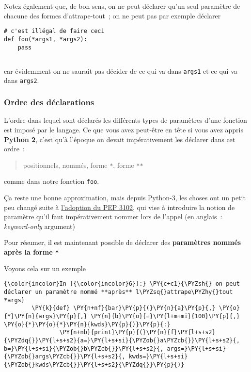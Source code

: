     Notez également que, de bon sens, on ne peut déclarer qu'un seul
paramètre de chacune des formes d'attrape-tout~; on ne peut pas par
exemple déclarer

\begin{verbatim}
# c'est illégal de faire ceci
def foo(*args1, *args2):
    pass
  
\end{verbatim}

car évidemment on ne saurait pas décider de ce qui va dans
\texttt{args1} et ce qui va dans \texttt{args2}.

    \hypertarget{ordre-des-duxe9clarations}{%
\subsubsection{Ordre des déclarations}\label{ordre-des-duxe9clarations}}

    L'ordre dans lequel sont déclarés les différents types de paramètres
d'une fonction est imposé par le langage. Ce que vous avez peut-être en
tête si vous avez appris \textbf{Python 2}, c'est qu'à l'époque on
devait impérativement les déclarer dans cet ordre~:

\begin{quote}
positionnels, nommés, forme \texttt{*}, forme \texttt{**}
\end{quote}

comme dans notre fonction \texttt{foo}.

    Ça reste une bonne approximation, mais depuis Python-3, les choses ont
un petit peu changé suite à
\href{https://www.python.org/dev/peps/pep-3102/}{l'adoption du PEP
3102}, qui vise à introduire la notion de paramètre qu'il faut
impérativement nommer lors de l'appel (en anglais~: \emph{keyword-only}
argument)

    Pour résumer, il est maintenant possible de déclarer des
\textbf{paramètres nommés après la forme \texttt{*}}

Voyons cela sur un exemple

    \begin{Verbatim}[commandchars=\\\{\}]
{\color{incolor}In [{\color{incolor}6}]:} \PY{c+c1}{\PYZsh{} on peut déclarer un paramètre nommé **après** l\PYZsq{}attrape\PYZhy{}tout *args}
        \PY{k}{def} \PY{n+nf}{bar}\PY{p}{(}\PY{n}{a}\PY{p}{,} \PY{o}{*}\PY{n}{args}\PY{p}{,} \PY{n}{b}\PY{o}{=}\PY{l+m+mi}{100}\PY{p}{,} \PY{o}{*}\PY{o}{*}\PY{n}{kwds}\PY{p}{)}\PY{p}{:}
                \PY{n+nb}{print}\PY{p}{(}\PY{n}{f}\PY{l+s+s2}{\PYZdq{}}\PY{l+s+s2}{a=}\PY{l+s+si}{\PYZob{}a\PYZcb{}}\PY{l+s+s2}{, b=}\PY{l+s+si}{\PYZob{}b\PYZcb{}}\PY{l+s+s2}{, args=}\PY{l+s+si}{\PYZob{}args\PYZcb{}}\PY{l+s+s2}{, kwds=}\PY{l+s+si}{\PYZob{}kwds\PYZcb{}}\PY{l+s+s2}{\PYZdq{}}\PY{p}{)}
\end{Verbatim}



